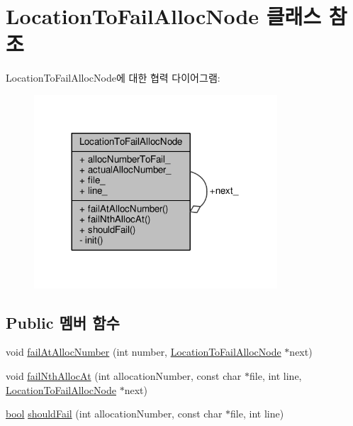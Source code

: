 \hypertarget{class_location_to_fail_alloc_node}{}\section{Location\+To\+Fail\+Alloc\+Node 클래스 참조}
\label{class_location_to_fail_alloc_node}


Location\+To\+Fail\+Alloc\+Node에 대한 협력 다이어그램\+:
\nopagebreak
\begin{figure}[H]
\begin{center}
\leavevmode
\includegraphics[width=257pt]{class_location_to_fail_alloc_node__coll__graph}
\end{center}
\end{figure}
\subsection*{Public 멤버 함수}
\begin{DoxyCompactItemize}
\item 
void \hyperlink{class_location_to_fail_alloc_node_a5b27e219fd701c099e7eebf071e8d8eb}{fail\+At\+Alloc\+Number} (int number, \hyperlink{class_location_to_fail_alloc_node}{Location\+To\+Fail\+Alloc\+Node} $\ast$next)
\item 
void \hyperlink{class_location_to_fail_alloc_node_aad5b416f1449f6c54736135d330eac79}{fail\+Nth\+Alloc\+At} (int allocation\+Number, const char $\ast$file, int line, \hyperlink{class_location_to_fail_alloc_node}{Location\+To\+Fail\+Alloc\+Node} $\ast$next)
\item 
\hyperlink{avb__gptp_8h_af6a258d8f3ee5206d682d799316314b1}{bool} \hyperlink{class_location_to_fail_alloc_node_a2690f4527e513193a643ef3aed06e3e5}{should\+Fail} (int allocation\+Number, const char $\ast$file, int line)
\end{DoxyCompactItemize}

